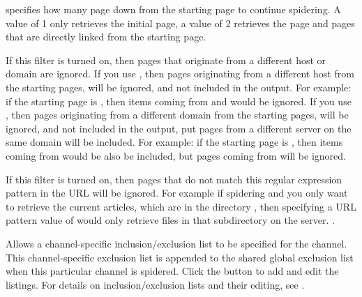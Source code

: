  specifies how many page down from the starting
page to continue spidering. A value of 1 only retrieves the initial page, a
value of 2 retrieves the page and pages that are directly linked from the
starting page.

 If this filter is turned
on, then pages that originate from a different host or domain are ignored.
If you use , then pages originating from a
different host from the starting pages, will be ignored, and not included in
the output. For example: if the starting page is
, then items coming from
 and  would be ignored.
If you use , then pages originating from a
different domain from the starting pages, will be ignored, and not included in
the output, put pages from a different server on the same domain will be
included. For example: if the starting page is
, then items coming from
 would be also be included, but pages coming 
from  will be ignored.

 If this filter is turned on, then pages 
that do not match this regular expression pattern in the URL will be ignored.
For example if spidering  and you only want to retrieve the
current articles, which are in the directory , then 
specifying a URL pattern value of  would only 
retrieve files in that subdirectory on the server. 
.

 Allows a channel-specific 
inclusion/exclusion list to be specified for the channel. 
This channel-specific exclusion list is appended to the shared 
global exclusion list when this particular channel is spidered. 
Click the 
button to add and edit the listings. For details on inclusion/exclusion lists 
and their editing, see 
\helpignore{\ref{sec:pd-exclusion-dialog}}
.


